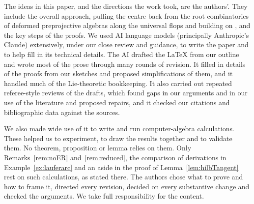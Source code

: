 \documentclass[11pt]{amsart}
\numberwithin{table}{section}
\numberwithin{figure}{section}
\numberwithin{equation}{section}
\theoremstyle{definition}
\theoremstyle{plain}
\begin{document}
The ideas in this paper, and the directions the work took, are the authors'. They include the overall approach, pulling the centre back from the root combinatorics of deformed preprojective algebras along the universal flops and building on \cite{K}, and the key steps of the proofs. We used AI language models (principally Anthropic's Claude) extensively, under our close review and guidance, to write the paper and to help fill in its technical details. The AI drafted the \LaTeX{} from our outline and wrote most of the prose through many rounds of revision. It filled in details of the proofs from our sketches and proposed simplifications of them, and it handled much of the Lie-theoretic bookkeeping. It also carried out repeated referee-style reviews of the drafts, which found gaps in our arguments and in our use of the literature and proposed repairs, and it checked our citations and bibliographic data against the sources.

We also made wide use of it to write and run computer-algebra calculations. These helped us to experiment, to draw the results together and to validate them. No theorem, proposition or lemma relies on them. Only Remarks~\ref{rem:noER} and~\ref{rem:reduced}, the comparison of derivations in Example~\ref{ex:lauferarc} and an aside in the proof of Lemma~\ref{lem:hilbTangent} rest on such calculations, as stated there. The authors chose what to prove and how to frame it, directed every revision, decided on every substantive change and checked the arguments. We take full responsibility for the content.
\end{document}
